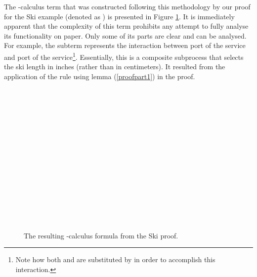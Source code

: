 \documentclass[copyright,creativecommons]{eptcs}
\begin{document}
The -calculus term that was constructed following this methodology by our proof for the Ski example (denoted as ) is presented in Figure \ref{fig:SkiPiResult}. It is immediately apparent that the complexity of this term prohibits any attempt to fully analyse its functionality on paper. Only some of its parts are clear and can be analysed. For example, the subterm  represents the interaction between port  of the  service and port  of the  service\footnote{Note how both  and  are substituted by  in order to accomplish this interaction.}. Essentially, this is a composite subprocess that selects the ski length in inches (rather than in centimeters). It resulted from the application of the  rule using lemma (\ref{proofpart1}) in the proof.
\begin{figure}[tbp]
\centering
\begin{minipage}{.65\linewidth}
\begin{flushleft}
\hspace*{0mm}   \\
\hspace*{5mm}   \\
\hspace*{10mm}   \\
\hspace*{15mm}  \\
\hspace*{15mm} \\
\hspace*{10mm}  \\
\hspace*{15mm} \\
\hspace*{15mm} \\
\hspace*{20mm} \\
\hspace*{25mm} \\
\hspace*{30mm} \\
\hspace*{15mm}  \\
\hspace*{10mm}  \\
\hspace*{5mm}  \\
  \end{flushleft}
  \end{minipage}
	\caption{The resulting -calculus formula from the Ski proof.}
	\label{fig:SkiPiResult}
\end{figure}
\end{document}
